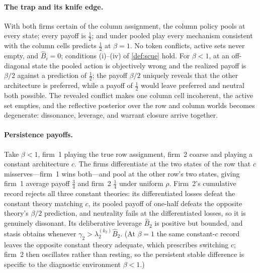 \documentclass[11pt]{article}
\theoremstyle{definition}
\begin{document}
\paragraph{The trap and its knife edge.}
With both firms certain of the column assignment, the column policy pools at every state; every payoff is $\tfrac12$; and under pooled play every mechanism consistent with the column cells predicts $\tfrac12$ at $\beta=1$.
No token conflicts, active sets never empty, and $\widehat B_i=0$; conditions (i)--(iv) of \cref{def:scue} hold.
For $\beta<1$, at an off-diagonal state the pooled action is objectively wrong and the realized payoff is $\beta/2$ against a prediction of $\tfrac12$; the payoff $\beta/2$ uniquely reveals that the other architecture is preferred, while a payoff of $\tfrac12$ would leave preferred and neutral both possible.
The revealed conflict makes one column cell incoherent, the active set empties, and the reflective posterior over the row and column worlds becomes degenerate: dissonance, leverage, and warrant closure arrive together.

\paragraph{Persistence payoffs.}
Take $\beta<1$, firm~1 playing the true row assignment, firm~2 coarse and playing a constant architecture $c$.
The firms differentiate at the two states of the row that $c$ misserves---firm~1 wins both---and pool at the other row's two states, giving firm~1 average payoff $\tfrac34$ and firm~2 $\tfrac14$ under uniform $\rho$.
Firm~2's cumulative record rejects all three constant theories: its differentiated losses defeat the constant theory matching $c$, its pooled payoff of one-half defeats the opposite theory's $\beta/2$ prediction, and neutrality fails at the differentiated losses, so it is genuinely dissonant.
Its deliberative leverage $\widehat B_2$ is positive but bounded, and stasis obtains whenever $\gamma_2>\lambda_2^{(k_2)}\widehat B_2$.
(At $\beta=1$ the same constant-$c$ record leaves the opposite constant theory adequate, which prescribes switching $c$; firm~2 then oscillates rather than resting, so the persistent stable difference is specific to the diagnostic environment $\beta<1$.)
\end{document}
